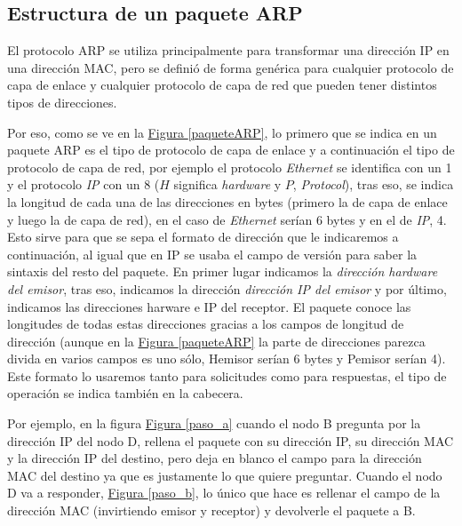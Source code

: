 \documentclass[10pt,a4paper,spanish]{report}
\begin{document}
\subsection{\textcolor{tema4}Estructura de un paquete ARP}
El protocolo ARP se utiliza principalmente para transformar una dirección IP en una dirección MAC, pero se definió de forma genérica para cualquier protocolo de capa de enlace y cualquier protocolo de capa de red que pueden tener distintos tipos de direcciones.

Por eso, como se ve en la \hyperref[paqueteARP]{Figura \ref*{paqueteARP}}, lo primero que se indica en un paquete ARP es el tipo de protocolo de capa de enlace y a continuación el tipo de protocolo de capa de red, por ejemplo el protocolo \textit{\textcolor{tema4}{Ethernet}} se identifica con un 1 y el protocolo \textit{\textcolor{tema4}{IP}} con un 8 ($H$ significa \textit{\textcolor{tema4}{hardware}} y $P$, \textit{\textcolor{tema4}{Protocol}}), tras eso, se indica la longitud de cada una de las direcciones en bytes (primero la de capa de enlace y luego la de capa de red), en el caso de \textit{\textcolor{tema4}{Ethernet}} serían 6 bytes y en el de \textit{\textcolor{tema4}{IP}}, 4. Esto sirve para que se sepa el formato de dirección que le indicaremos a continuación, al igual que en IP se usaba el campo de versión para saber la sintaxis del resto del paquete. En primer lugar indicamos la \textit{\textcolor{tema4}{dirección hardware del emisor}}, tras eso, indicamos la dirección \textit{\textcolor{tema4}{dirección IP del emisor}} y por último, indicamos las direcciones harware e IP del receptor. El paquete conoce las longitudes de todas estas direcciones gracias a los campos de longitud de dirección (aunque en la \hyperref[paqueteARP]{Figura \ref*{paqueteARP}} la parte de direcciones parezca divida en varios campos es uno sólo, Hemisor serían 6 bytes y Pemisor serían 4). Este formato lo usaremos tanto para solicitudes como para respuestas, el tipo de operación se indica también en la cabecera. 

Por ejemplo, en la figura \hyperref[paso_a]{Figura \ref*{paso_a}} cuando el nodo B pregunta por la dirección IP del nodo D, rellena el paquete con su dirección IP, su dirección MAC y la dirección IP del destino, pero deja en blanco el campo para la dirección MAC del destino ya que es justamente lo que quiere preguntar. Cuando el nodo D va a responder, \hyperref[paso_b]{Figura \ref*{paso_b}}, lo único que hace es rellenar el campo de la dirección MAC (invirtiendo emisor y receptor) y devolverle el paquete a B.
\end{document}
